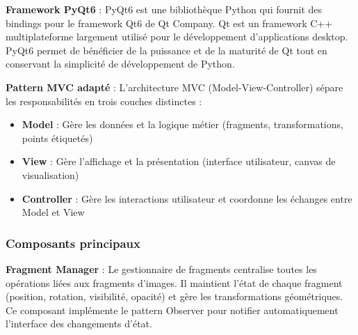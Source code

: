 \documentclass[12pt,a4paper]{report}
\begin{document}
\textbf{Framework PyQt6} : PyQt6 est une bibliothèque Python qui fournit des bindings pour le framework Qt6 de Qt Company. Qt est un framework C++ multiplateforme largement utilisé pour le développement d'applications desktop. PyQt6 permet de bénéficier de la puissance et de la maturité de Qt tout en conservant la simplicité de développement de Python.

\textbf{Pattern MVC adapté} : L'architecture MVC (Model-View-Controller) sépare les responsabilités en trois couches distinctes :
\begin{itemize}
\item \textbf{Model} : Gère les données et la logique métier (fragments, transformations, points étiquetés)
\item \textbf{View} : Gère l'affichage et la présentation (interface utilisateur, canvas de visualisation)
\item \textbf{Controller} : Gère les interactions utilisateur et coordonne les échanges entre Model et View
\end{itemize}

\subsubsection{Composants principaux}

\textbf{Fragment Manager} : Le gestionnaire de fragments centralise toutes les opérations liées aux fragments d'images. Il maintient l'état de chaque fragment (position, rotation, visibilité, opacité) et gère les transformations géométriques. Ce composant implémente le pattern Observer pour notifier automatiquement l'interface des changements d'état.
\end{document}

